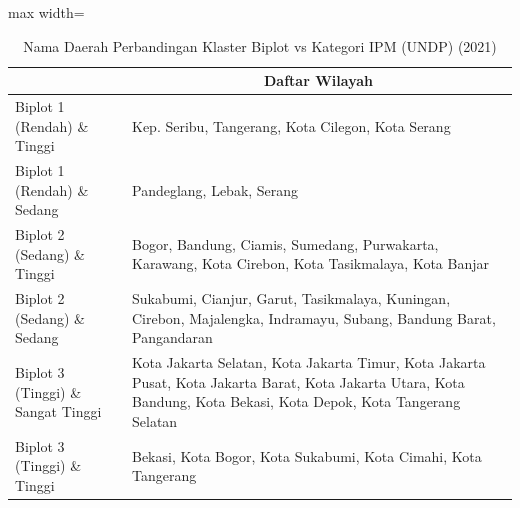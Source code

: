 \begin{table}[H]
\centering
\caption{Nama Daerah Perbandingan Klaster Biplot vs Kategori IPM (UNDP) (2021)} \label{tab:app2crossname2021}
\begin{adjustbox}{max width=\textwidth}
\begin{tabular}{|>{\centering\arraybackslash}p{4cm}|p{10cm}|}
\hline
\multicolumn{1}{|c|}{\textbf{Kategori}} & \multicolumn{1}{c|}{\textbf{Daftar Wilayah}} \\
\hline
Biplot 1 (Rendah) \& Tinggi & Kep. Seribu, Tangerang, Kota Cilegon, Kota Serang \\
\hline
Biplot 1 (Rendah) \& Sedang & Pandeglang, Lebak, Serang \\
\hline
Biplot 2 (Sedang) \& Tinggi & Bogor, Bandung, Ciamis, Sumedang, Purwakarta, Karawang, Kota Cirebon, Kota Tasikmalaya, Kota Banjar \\
\hline
Biplot 2 (Sedang) \& Sedang & Sukabumi, Cianjur, Garut, Tasikmalaya, Kuningan, Cirebon, Majalengka, Indramayu, Subang, Bandung Barat, Pangandaran \\
\hline
Biplot 3 (Tinggi) \& Sangat Tinggi & Kota Jakarta Selatan, Kota Jakarta Timur, Kota Jakarta Pusat, Kota Jakarta Barat, Kota Jakarta Utara, Kota Bandung, Kota Bekasi, Kota Depok, Kota Tangerang Selatan \\
\hline
Biplot 3 (Tinggi) \& Tinggi & Bekasi, Kota Bogor, Kota Sukabumi, Kota Cimahi, Kota Tangerang \\
\hline
\end{tabular}
\end{adjustbox}
\end{table}